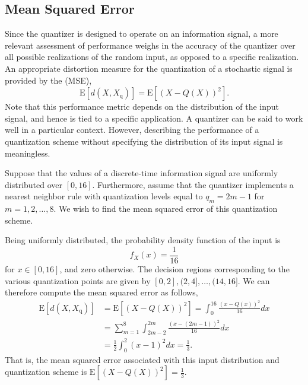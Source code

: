 \subsection{Mean Squared Error}

Since the quantizer is designed to operate on an information signal, a more relevant assessment of performance weighs in the accuracy of the quantizer over all possible realizations of the random input, as opposed to a specific realization.
An appropriate distortion measure for the quantization of a stochastic signal is provided by the  (MSE),
\begin{equation} \label{equation:QuantizationMSE}
\mathrm{E} [ d(X, X_{\mathrm{q}}) ]
= \mathrm{E} \left[ \left( X - Q(X) \right)^2 \right] .
\end{equation}
Note that this performance metric depends on the distribution of the input signal, and hence is tied to a specific application.
A quantizer can be said to work well in a particular context.
However, describing the performance of a quantization scheme without specifying the distribution of its input signal is meaningless.

\begin{example} \label{example:UniformQuantizer}
Suppose that the values of a discrete-time information signal are uniformly distributed over $[0,16]$.
Furthermore, assume that the quantizer implements a nearest neighbor rule with quantization levels equal to $q_m = 2m - 1$ for $m = 1, 2, \ldots, 8$.
We wish to find the mean squared error of this quantization scheme.

Being uniformly distributed, the probability density function of the input is
\begin{equation*}
f_X (x) = \frac{1}{16}
\end{equation*}
for $x \in [0, 16]$, and zero otherwise.
The decision regions corresponding to the various quantization points are given by $[0, 2], (2, 4], \ldots, (14, 16]$.
We can therefore compute the mean squared error as follows,
\begin{equation*}
\begin{split}
\mathrm{E} [ d(X, X_{\mathrm{q}}) ]
&= \mathrm{E} \left[ \left( X - Q(X) \right)^2 \right]
= \int_0^{16} \frac{(x - Q(x))^2}{16} dx \\
&= \sum_{m=1}^8 \int_{2m-2}^{2m} \frac{(x - (2m - 1))^2}{16} dx \\
&= \frac{1}{2} \int_{0}^{2} (x - 1)^2 dx = \frac{1}{3} .
\end{split}
\end{equation*}
That is, the mean squared error associated with this input distribution and quantization scheme is $\mathrm{E} \left[ (X - Q(X))^2 \right] = \frac{1}{3}$.
\end{example}



